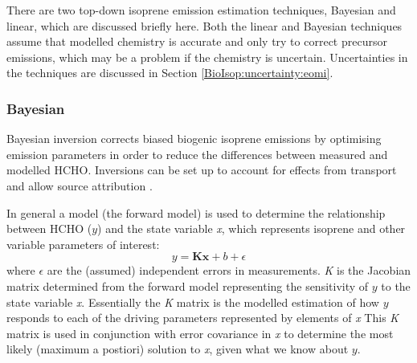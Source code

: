     There are two top-down isoprene emission estimation techniques, Bayesian and linear, which are discussed briefly here.
    Both the linear and Bayesian techniques assume that modelled chemistry is accurate and only try to correct precursor emissions, which may be a problem if the chemistry is uncertain.
    Uncertainties in the techniques are discussed in Section \ref{BioIsop:uncertainty:eomi}.
    
    
    \subsubsection{Bayesian}
    
      Bayesian inversion corrects biased biogenic isoprene emissions by optimising emission parameters in order to reduce the differences between measured and modelled HCHO.
      Inversions can be set up to account for effects from transport and allow source attribution \parencite{FortemsCheiney2012}.
      
      In general a model (the forward model) is used to determine the relationship between HCHO ($y$) and the state variable \emph{x}, which represents isoprene and other variable parameters of interest:
      \begin{equation}
        \label{BioIsop:intro:top_down_estimates:eqn_bayesian}
        y=\mathbf{Kx} + b + \epsilon
      \end{equation}
      where $\epsilon$ are the (assumed) independent errors in measurements.
      \emph{K} is the Jacobian matrix determined from the forward model representing the sensitivity of $y$ to the state variable \emph{x}.
      Essentially the \emph{K} matrix is the modelled estimation of how $y$ responds to each of the driving parameters represented by elements of \emph{x}
      This \emph{K} matrix is used in conjunction with error covariance in \emph{x} to determine the most likely (maximum a postiori) solution to \emph{x}, given what we know about $y$. %
      
